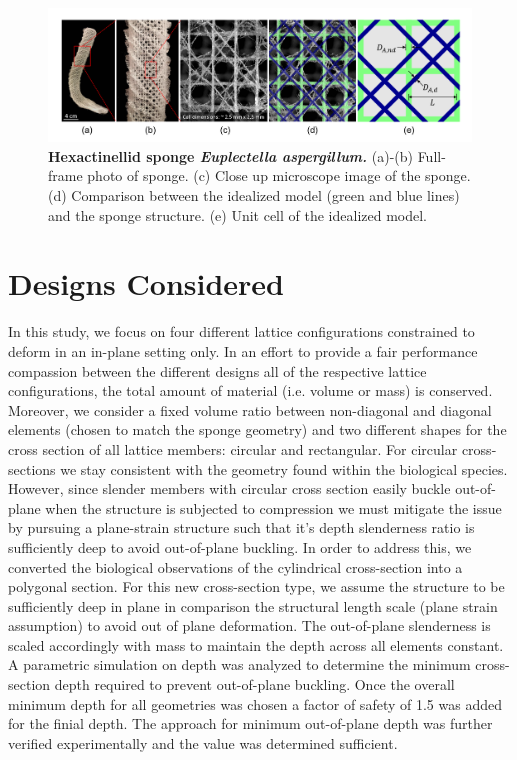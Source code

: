 \documentclass[10pt,twoside]{fernandes_supp}
\begin{document}
\begin{figure}[H]
    \centering
    \includegraphics[width=0.9\linewidth]{SFig1.png}
    \caption{\textbf{Hexactinellid sponge \textit{Euplectella aspergillum.}} (a)-(b) Full-frame photo of sponge.  (c)  Close up microscope image of the sponge. (d) Comparison between the idealized model (green and blue lines) and the sponge structure. (e) Unit cell of the idealized model.}
    \label{Sponge}
\end{figure}

\section{Designs Considered}
In this study, we focus on four different lattice configurations constrained to deform in an in-plane setting only. In an effort to provide a fair performance compassion between the different designs all of the respective lattice configurations, the total amount of material (i.e. volume or mass) is conserved. Moreover,  we consider a fixed volume ratio between non-diagonal and diagonal elements (chosen to match the sponge geometry) and two different shapes for the cross section of all lattice members: circular and rectangular.  For circular cross-sections  we stay consistent with the geometry found within the biological species. However, since slender members with circular cross section easily buckle out-of-plane when the structure is subjected to compression we must mitigate the issue by pursuing a plane-strain structure such that it's depth slenderness ratio is sufficiently deep to avoid out-of-plane buckling. In order to address this, we converted the biological observations of the cylindrical cross-section into a polygonal section. For this new cross-section type, we assume the structure to be sufficiently deep in plane in comparison the structural length scale (plane strain assumption) to avoid out of plane deformation. The out-of-plane slenderness is scaled accordingly with mass to maintain the depth across all elements constant. A parametric simulation on depth was analyzed to determine the minimum cross-section depth required to prevent out-of-plane buckling. Once the overall minimum depth for all geometries was chosen a factor of safety of 1.5 was added for the finial depth. The approach for minimum out-of-plane depth was further verified experimentally and the value was determined sufficient.
\end{document}
